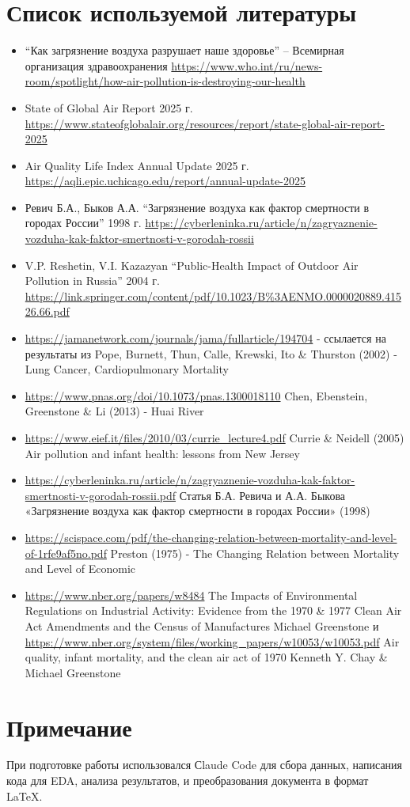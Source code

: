 \documentclass[11pt,a4paper]{article}
\begin{document}
\section*{Список используемой литературы}
\begin{itemize}
\item “Как загрязнение воздуха разрушает наше здоровье” – Всемирная организация здравоохранения \url{https://www.who.int/ru/news-room/spotlight/how-air-pollution-is-destroying-our-health}
\item State of Global Air Report 2025 г. \url{https://www.stateofglobalair.org/resources/report/state-global-air-report-2025}
\item Air Quality Life Index Annual Update 2025 г. \url{https://aqli.epic.uchicago.edu/report/annual-update-2025}
\item Ревич Б.А., Быков А.А. “Загрязнение воздуха как фактор смертности в городах России” 1998 г. \url{https://cyberleninka.ru/article/n/zagryaznenie-vozduha-kak-faktor-smertnosti-v-gorodah-rossii}
\item V.P. Reshetin, V.I. Kazazyan “Public-Health Impact of Outdoor Air Pollution in Russia” 2004 г. \url{https://link.springer.com/content/pdf/10.1023/B\%3AENMO.0000020889.41526.66.pdf}
\item \url{https://jamanetwork.com/journals/jama/fullarticle/194704} - ссылается на результаты из Pope, Burnett, Thun, Calle, Krewski, Ito \& Thurston (2002) - Lung Cancer, Cardiopulmonary Mortality
\item \url{https://www.pnas.org/doi/10.1073/pnas.1300018110} Chen, Ebenstein, Greenstone \& Li (2013) - Huai River
\item \url{https://www.eief.it/files/2010/03/currie_lecture4.pdf} Currie \& Neidell (2005) Air pollution and infant health: lessons from New Jersey
\item \url{https://cyberleninka.ru/article/n/zagryaznenie-vozduha-kak-faktor-smertnosti-v-gorodah-rossii.pdf} Статья Б.А. Ревича и А.А. Быкова «Загрязнение воздуха как фактор смертности в городах России»  (1998)
\item \url{https://scispace.com/pdf/the-changing-relation-between-mortality-and-level-of-1rfe9af5no.pdf} Preston (1975) - The Changing Relation between Mortality and Level of Economic
\item \url{https://www.nber.org/papers/w8484} The Impacts of Environmental Regulations on Industrial Activity: Evidence from the 1970 \& 1977 Clean Air Act Amendments and the Census of Manufactures Michael Greenstone и \url{https://www.nber.org/system/files/working_papers/w10053/w10053.pdf} Air quality, infant mortality, and the clean air act of 1970 Kenneth Y. Chay \& Michael Greenstone
\end{itemize}
\section*{Примечание}
При подготовке работы использовался Сlaude Code для сбора данных, написания кода для EDA, анализа результатов, и преобразования документа в формат LaTeX.
\end{document}
